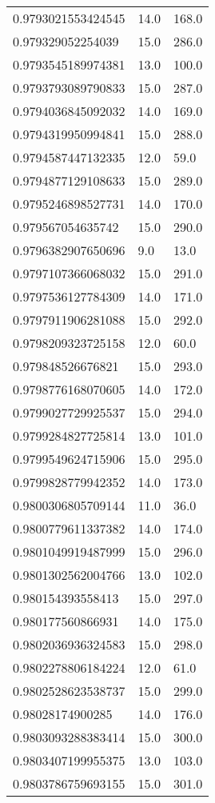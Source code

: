 \begin{center}
\begin{supertabular}[H]{p{0.30\textwidth}p{0.05\textwidth}p{0.05\textwidth}}
0.9793021553424545 & 14.0 & 168.0 \\ 
0.979329052254039 & 15.0 & 286.0 \\ 
0.9793545189974381 & 13.0 & 100.0 \\ 
0.9793793089790833 & 15.0 & 287.0 \\ 
0.9794036845092032 & 14.0 & 169.0 \\ 
0.9794319950994841 & 15.0 & 288.0 \\ 
0.9794587447132335 & 12.0 & 59.0 \\ 
0.9794877129108633 & 15.0 & 289.0 \\ 
0.9795246898527731 & 14.0 & 170.0 \\ 
0.979567054635742 & 15.0 & 290.0 \\ 
0.9796382907650696 & 9.0 & 13.0 \\ 
0.9797107366068032 & 15.0 & 291.0 \\ 
0.9797536127784309 & 14.0 & 171.0 \\ 
0.9797911906281088 & 15.0 & 292.0 \\ 
0.9798209323725158 & 12.0 & 60.0 \\ 
0.979848526676821 & 15.0 & 293.0 \\ 
0.9798776168070605 & 14.0 & 172.0 \\ 
0.9799027729925537 & 15.0 & 294.0 \\ 
0.9799284827725814 & 13.0 & 101.0 \\ 
0.9799549624715906 & 15.0 & 295.0 \\ 
0.9799828779942352 & 14.0 & 173.0 \\ 
0.9800306805709144 & 11.0 & 36.0 \\ 
0.9800779611337382 & 14.0 & 174.0 \\ 
0.9801049919487999 & 15.0 & 296.0 \\ 
0.9801302562004766 & 13.0 & 102.0 \\ 
0.980154393558413 & 15.0 & 297.0 \\ 
0.980177560866931 & 14.0 & 175.0 \\ 
0.9802036936324583 & 15.0 & 298.0 \\ 
0.9802278806184224 & 12.0 & 61.0 \\ 
0.9802528623538737 & 15.0 & 299.0 \\ 
0.98028174900285 & 14.0 & 176.0 \\ 
0.9803093288383414 & 15.0 & 300.0 \\ 
0.9803407199955375 & 13.0 & 103.0 \\ 
0.9803786759693155 & 15.0 & 301.0 \\ 

\end{supertabular}
\end{center}
